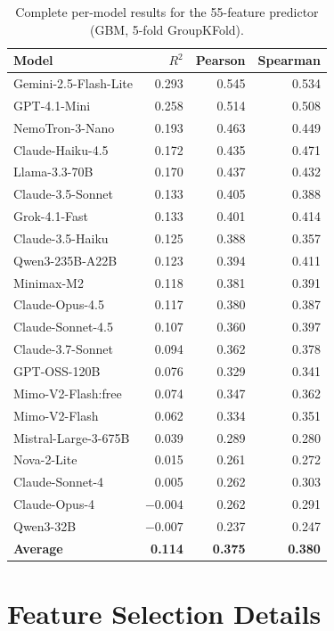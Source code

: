 \documentclass{article}
\begin{document}
\begin{table}[h]
\centering
\caption{Complete per-model results for the 55-feature predictor (GBM, 5-fold GroupKFold).}
\label{tab:full_per_model}
\small
\begin{tabular}{@{}lrrr@{}}
\toprule
Model & $R^2$ & Pearson & Spearman \\
\midrule
Gemini-2.5-Flash-Lite & 0.293 & 0.545 & 0.534 \\
GPT-4.1-Mini & 0.258 & 0.514 & 0.508 \\
NemoTron-3-Nano & 0.193 & 0.463 & 0.449 \\
Claude-Haiku-4.5 & 0.172 & 0.435 & 0.471 \\
Llama-3.3-70B & 0.170 & 0.437 & 0.432 \\
Claude-3.5-Sonnet & 0.133 & 0.405 & 0.388 \\
Grok-4.1-Fast & 0.133 & 0.401 & 0.414 \\
Claude-3.5-Haiku & 0.125 & 0.388 & 0.357 \\
Qwen3-235B-A22B & 0.123 & 0.394 & 0.411 \\
Minimax-M2 & 0.118 & 0.381 & 0.391 \\
Claude-Opus-4.5 & 0.117 & 0.380 & 0.387 \\
Claude-Sonnet-4.5 & 0.107 & 0.360 & 0.397 \\
Claude-3.7-Sonnet & 0.094 & 0.362 & 0.378 \\
GPT-OSS-120B & 0.076 & 0.329 & 0.341 \\
Mimo-V2-Flash:free & 0.074 & 0.347 & 0.362 \\
Mimo-V2-Flash & 0.062 & 0.334 & 0.351 \\
Mistral-Large-3-675B & 0.039 & 0.289 & 0.280 \\
Nova-2-Lite & 0.015 & 0.261 & 0.272 \\
Claude-Sonnet-4 & 0.005 & 0.262 & 0.303 \\
Claude-Opus-4 & $-0.004$ & 0.262 & 0.291 \\
Qwen3-32B & $-0.007$ & 0.237 & 0.247 \\
\midrule
\textbf{Average} & \textbf{0.114} & \textbf{0.375} & \textbf{0.380} \\
\bottomrule
\end{tabular}
\end{table}


\section{Feature Selection Details}
\label{app:feature_selection}
\end{document}
